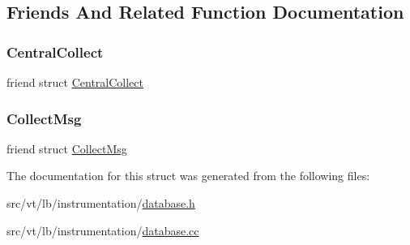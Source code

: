 \subsection{Friends And Related Function Documentation}
\mbox{\label{structvt_1_1lb_1_1instrumentation_1_1_database_aeab4bdfa8ef385d221a4bb517e4d01fc}} 
\subsubsection{\texorpdfstring{Central\+Collect}{CentralCollect}}
{\footnotesize\ttfamily friend struct \hyperlink{structvt_1_1lb_1_1instrumentation_1_1_central_collect}{Central\+Collect}\hspace{0.3cm}{\ttfamily [friend]}}

\mbox{\label{structvt_1_1lb_1_1instrumentation_1_1_database_a3775df26b6b7ed805def8013957fd548}} 
\subsubsection{\texorpdfstring{Collect\+Msg}{CollectMsg}}
{\footnotesize\ttfamily friend struct \hyperlink{structvt_1_1lb_1_1instrumentation_1_1_collect_msg}{Collect\+Msg}\hspace{0.3cm}{\ttfamily [friend]}}



The documentation for this struct was generated from the following files\+:\begin{DoxyCompactItemize}
\item 
src/vt/lb/instrumentation/\hyperlink{database_8h}{database.\+h}\item 
src/vt/lb/instrumentation/\hyperlink{database_8cc}{database.\+cc}\end{DoxyCompactItemize}
